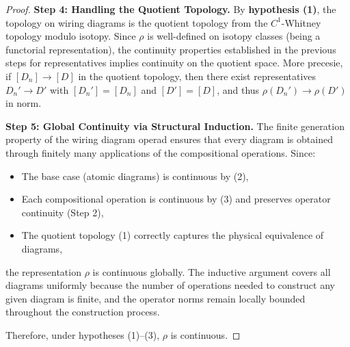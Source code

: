 \documentclass[11pt]{article}
\begin{document}
\begin{proof}
\noindent\textbf{Step 4: Handling the Quotient Topology.}
By \textbf{hypothesis (1)}, the topology on wiring diagrams is the quotient topology from the $C^1$-Whitney topology modulo isotopy. Since $\rho$ is well-defined on isotopy classes (being a functorial representation), the continuity properties established in the previous steps for representatives implies continuity on the quotient space. More precesie, if $[D_n] \to [D]$ in the quotient topology, then there exist representatives $D_n' \to D'$ with $[D_n'] = [D_n]$ and $[D'] = [D]$, and thus $\rho(D_n') \to \rho(D')$ in norm.

\noindent\textbf{Step 5: Global Continuity via Structural Induction.}
The finite generation property of the wiring diagram operad ensures that every diagram is obtained through finitely many applications of the compositional operations. Since:
\begin{itemize}
\item The base case (atomic diagrams) is continuous by (2),
\item Each compositional operation is continuous by (3) and preserves operator continuity (Step 2),
\item The quotient topology (1) correctly captures the physical equivalence of diagrams,
\end{itemize}
the representation $\rho$ is continuous globally. The inductive argument covers all diagrams uniformly because the number of operations needed to construct any given diagram is finite, and the operator norms remain locally bounded throughout the construction process.

Therefore, under hypotheses (1)--(3), $\rho$ is continuous.
\end{proof}
\end{document}
